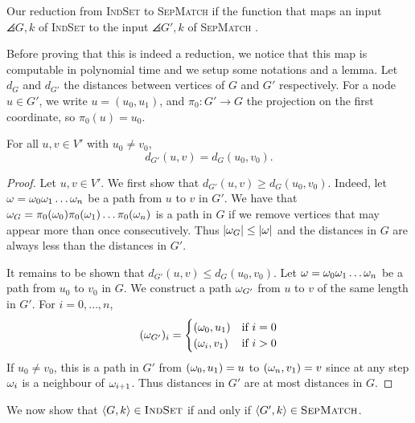     Our reduction from \textsc{IndSet} to \textsc{SepMatch}
    if the function that maps an input $\angles{G,k}$ of \textsc{IndSet}
    to the input $\angles{G',k}$ of \textsc{SepMatch} .

    Before proving that this is indeed a reduction, we notice that this map 
    is computable in polynomial time and we setup some notations and a lemma.
    Let $d_G$ and $d_{G'}$ the distances between vertices of $G$ and $G'$
    respectively. For a node $u \in G'$, we write $u = (u_0, u_1)$,
    and $\pi_0: G' \to G$ the projection on the first coordinate, so $\pi_0(u) = u_0$.

    \begin{lemma*}
        For all $u, v \in V'$ with $u_0 \neq v_0$, \[
            d_{G'}(u, v) = d_G(u_0, v_0).
        \]
    \end{lemma*}
    \begin{proof}
        Let $u, v \in V'$. We first show that $d_{G'}(u, v) \geq d_G(u_0, v_0)$.
        Indeed, let $\omega = \omega_0\omega_1\dots\omega_n$ be a path from $u$ to $v$ in $G'$. 
        We have that $\omega_G = \pi_0(\omega_0) \pi_0(\omega_1) \dots \pi_0(\omega_n)$
        is a path in $G$ if we remove vertices that may appear more than once consecutively.
        Thus $\left| \omega_G \right| \leq \left| \omega \right|$ and the distances in $G$ are always 
        less than the distances in $G'$.

        It remains to be shown that $d_{G'}(u, v) \leq d_G(u_0, v_0)$.
        Let $\omega = \omega_0\omega_1\dots\omega_n$  be a path from $u_0$ to $v_0$ in $G$. We
        construct a path $\omega_{G'}$ from $u$ to $v$ of the same length 
        in $G'$. For $i = 0, \dots, n$,
        \[ 
            (\omega_{G'})_i = \begin{cases}
                (\omega_0, u_1) & \text{if } i = 0 \\
                (\omega_i, v_1) & \text{if } i > 0
            \end{cases}
        \]
        If $u_0 \neq v_0$, this is a path in $G'$ from $(\omega_0, u_1) = u$ to $(\omega_n, v_1) = v$
        since at any step $\omega_i$ is a neighbour of $\omega_{i+1}$.
        Thus distances in $G'$ are at most distances in $G$.
    \end{proof}

    We now show that $\left\langle G, k \right\rangle \in \textsc{IndSet}$ if and only if 
    $\left\langle G', k \right\rangle \in \textsc{SepMatch}$.
    
